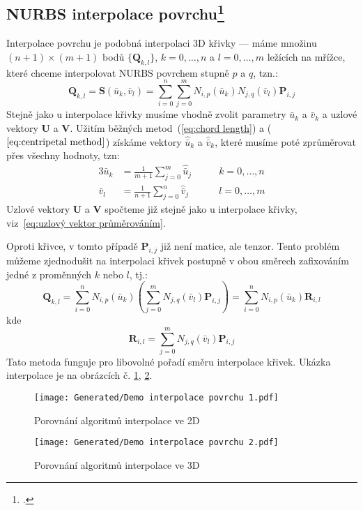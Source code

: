 \subsection[NURBS interpolace povrchu]{NURBS interpolace povrchu\footcite[kapitola 9.2.5]{The_NURBS_Book}}\label{sec:NURBS interpolace povrchu}
Interpolace povrchu je podobná interpolaci 3D křivky --- máme množinu $(n + 1)
    \times (m + 1)$ bodů $\{\bm{Q}_{k,l}\}$, $k=0,\ldots,n$ a $l=0,\ldots,m$ ležících na mřížce, které
chceme interpolovat NURBS povrchem stupně $p$ a $q$, tzn.:
\begin{equation}
    \bm{Q}_{k,l} = \bm{S}(\bar{u}_k, \bar{v}_l) = \sum_{i=0}^{n}\sum_{j=0}^{m}
    N_{i,p}(\bar{u}_k)N_{j,q}(\bar{v}_l)\bm{P}_{i,j}
\end{equation}
Stejně jako u interpolace křivky musíme vhodně zvolit parametry $\bar{u}_k$ a $\bar{v}_k$
a uzlové vektory $\bm{U}$ a $\bm{V}$.
Užitím běžných metod~(\ref{eq:chord length}) a ($\ref{eq:centripetal method}$) získáme
vektory $\hat{\bar{u}}_k$ a $\hat{\bar{v}}_k$, které musíme poté
zprůměrovat přes všechny hodnoty, tzn:
\begin{alignat}{3}
    \bar{u}_k & = \frac{1}{m + 1}\sum_{j=0}^{m}\hat{\bar{u}}_j \quad\quad & k =0,\ldots,n \\
    \bar{v}_l & = \frac{1}{n + 1}\sum_{j=0}^{n}\hat{\bar{v}}_j\quad\quad  & l =0,\ldots,m
\end{alignat}
Uzlové vektory $\bm{U}$ a $\bm{V}$ spočteme již stejně jako u interpolace křivky,
viz~\ref{eq:uzlový vektor průměrováním}.\par
Oproti křivce, v tomto případě $\bm{P}_{i,j}$ již není matice, ale tenzor. Tento problém můžeme
zjednodušit na interpolaci křivek postupně v obou směrech
zafixováním jedné z proměnných $k$ nebo $l$, tj.:
\begin{equation}
    \bm{Q}_{k,l} =\sum_{i=0}^{n}N_{i,p}(\bar{u}_k)
    \left(\sum_{j=0}^{m}N_{j,q}(\bar{v}_l)\bm{P}_{i,j}\right)
    =\sum_{i=0}^{n}N_{i,p}(\bar{u}_k)\bm{R}_{i,l}
\end{equation}
kde \begin{equation}
    \bm{R}_{i,l} = \sum_{j=0}^{m}N_{j,q}(\bar{v}_l)\bm{P}_{i,j}
\end{equation}
Tato metoda funguje pro libovolné pořadí směru interpolace křivek.
Ukázka interpolace je na obrázcích č. \ref{fig:Demo interpolace povrchu 1}, \ref{fig:Demo interpolace povrchu 2}.
\begin{imagepage}
    \begin{figure}[H]
        \centering
        \texttt{[image: Generated/Demo interpolace povrchu 1.pdf]}
        \caption{Porovnání algoritmů interpolace ve 2D}
        \label{fig:Demo interpolace povrchu 1}
    \end{figure}
    \begin{figure}[H]
        \centering
        \texttt{[image: Generated/Demo interpolace povrchu 2.pdf]}
        \caption{Porovnání algoritmů interpolace ve 3D}
        \label{fig:Demo interpolace povrchu 2}
    \end{figure}
\end{imagepage}
